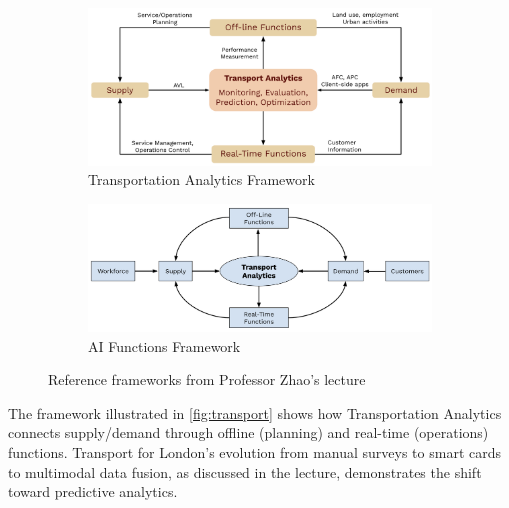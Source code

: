 \documentclass[11pt]{article}
\begin{document}
\begin{center}
\end{center}

\begin{figure}[h]
\centering
\begin{subfigure}{0.48\textwidth}
\centering
\includegraphics[width=\textwidth]{transport_analytics_graph.png}
\caption{Transportation Analytics Framework}
\label{fig:transport}
\end{subfigure}
\hfill
\begin{subfigure}{0.48\textwidth}
\centering
\includegraphics[width=\textwidth]{ai_graph.png}
\caption{AI Functions Framework}
\label{fig:ai}
\end{subfigure}
\caption{Reference frameworks from Professor Zhao's lecture}
\label{fig:frameworks}
\end{figure}

The framework illustrated in \autoref{fig:transport} shows how Transportation Analytics connects supply/demand through offline (planning) and real-time (operations) functions. Transport for London's evolution from manual surveys to smart cards to multimodal data fusion, as discussed in the lecture, demonstrates the shift toward predictive analytics.
\end{document}

